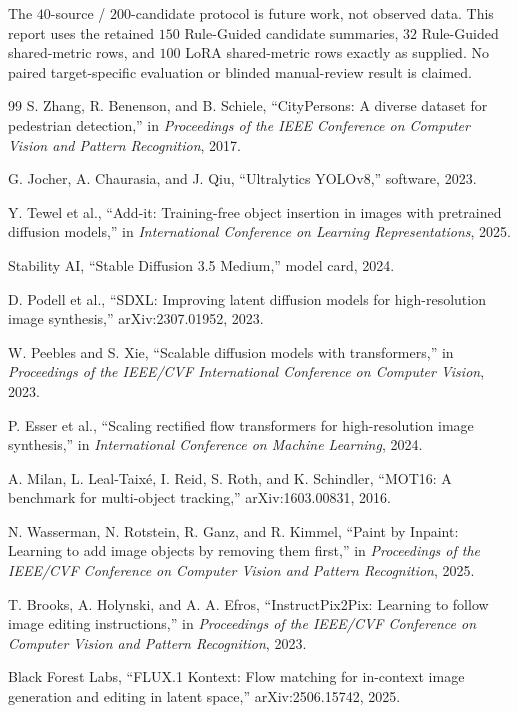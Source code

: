 \documentclass[11pt,a4paper]{article}
\begin{document}
The $40$-source / $200$-candidate protocol is future work, not observed data. This report uses the retained $150$ Rule-Guided candidate summaries, $32$ Rule-Guided shared-metric rows, and $100$ LoRA shared-metric rows exactly as supplied. No paired target-specific evaluation or blinded manual-review result is claimed.
\begin{thebibliography}{99}
S. Zhang, R. Benenson, and B. Schiele, ``CityPersons: A diverse dataset for pedestrian detection,'' in \emph{Proceedings of the IEEE Conference on Computer Vision and Pattern Recognition}, 2017.

G. Jocher, A. Chaurasia, and J. Qiu, ``Ultralytics YOLOv8,'' software, 2023.

Y. Tewel et al., ``Add-it: Training-free object insertion in images with pretrained diffusion models,'' in \emph{International Conference on Learning Representations}, 2025.

Stability AI, ``Stable Diffusion 3.5 Medium,'' model card, 2024.

D. Podell et al., ``SDXL: Improving latent diffusion models for high-resolution image synthesis,'' arXiv:2307.01952, 2023.

W. Peebles and S. Xie, ``Scalable diffusion models with transformers,'' in \emph{Proceedings of the IEEE/CVF International Conference on Computer Vision}, 2023.

P. Esser et al., ``Scaling rectified flow transformers for high-resolution image synthesis,'' in \emph{International Conference on Machine Learning}, 2024.

A. Milan, L. Leal-Taix\'e, I. Reid, S. Roth, and K. Schindler, ``MOT16: A benchmark for multi-object tracking,'' arXiv:1603.00831, 2016.

N. Wasserman, N. Rotstein, R. Ganz, and R. Kimmel, ``Paint by Inpaint: Learning to add image objects by removing them first,'' in \emph{Proceedings of the IEEE/CVF Conference on Computer Vision and Pattern Recognition}, 2025.

T. Brooks, A. Holynski, and A. A. Efros, ``InstructPix2Pix: Learning to follow image editing instructions,'' in \emph{Proceedings of the IEEE/CVF Conference on Computer Vision and Pattern Recognition}, 2023.

Black Forest Labs, ``FLUX.1 Kontext: Flow matching for in-context image generation and editing in latent space,'' arXiv:2506.15742, 2025.
\end{thebibliography}
\end{document}
